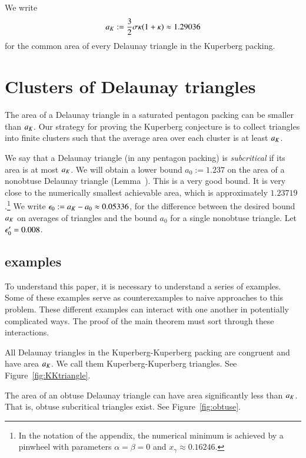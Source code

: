 We write 
\[
a_K := \frac{3}{2}{ \sigma \kappa(1+\kappa)} \approx 1.29036
\] %
for the common area of every Delaunay triangle in the 
Kuperberg packing.  

\section{Clusters of Delaunay triangles}

The area of a Delaunay triangle in a saturated pentagon packing can be
smaller than $a_K$.  Our strategy for proving the Kuperberg conjecture
is to collect triangles into finite clusters such that the average
area over each cluster is at least $a_K$.  

We say that a Delaunay triangle (in any pentagon packing) is {\it
  subcritical} if its area is at most $a_K$.  We will obtain a lower
bound $a_0 := 1.237$ on the area of a nonobtuse Delaunay triangle
(Lemma~).  This is a very good bound.  It is very close
to the numerically smallest achievable area, which is approximately
$1.23719$.\footnote{In the notation of the appendix, the numerical 
minimum is achieved by a pinwheel with parameters $\alpha=\beta=0$
and $x_\gamma\approx 0.16246$.}  
We write $\epsilon_0 := a_K - a_0 \approx 0.05336$, for the
difference between the desired bound $a_K$ on averages of triangles
and the bound $a_0$ for a single nonobtuse triangle.
Let $\epsilon_0' = 0.008$.  

\subsection{examples}

To understand this paper, it is necessary to understand a series of examples.
Some of these examples serve as counterexamples to naive approaches to this problem.
These different examples can interact with one another in potentially complicated ways.  The proof
of the main theorem must sort through these interactions.

\begin{example} All Delaunay triangles in the Kuperberg-Kuperberg packing are congruent and have
area $a_K$.
We call them Kuperberg-Kuperberg triangles. See Figure~\ref{fig:KKtriangle}.
\end{example}


\begin{example}  The area of an obtuse Delaunay triangle can have area
significantly less than $a_K$.  That is, obtuse subcritical triangles exist.
See Figure~\ref{fig:obtuse}.
\end{example}


